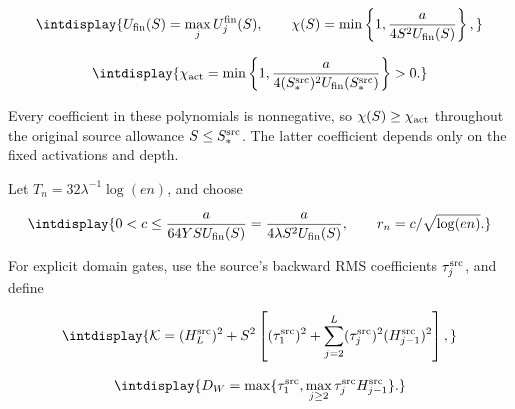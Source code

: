 \begingroup\renewcommand{\theHequation}{intdisplay.86}
\begin{equation*}
\intdisplay{
U_{\rm fin}(S)=\max_jU_j^{\rm fin}(S),\qquad
\chi(S)=\min\left\{1,\frac{a}{4S^2U_{\rm fin}(S)}\right\},
}
\end{equation*}
\endgroup

\begingroup\renewcommand{\theHequation}{intdisplay.87}
\begin{equation*}
\intdisplay{
\chi_{\rm act}=\min\left\{1,
\frac{a}{4(S_*^{\rm src})^2U_{\rm fin}(S_*^{\rm src})}\right\}>0.
}
\end{equation*}
\endgroup


Every coefficient in these polynomials is nonnegative, so \(\chi(S)\ge\chi_{\rm act}\) throughout the original source allowance \(S\le S_*^{\rm src}\). The latter coefficient depends only on the fixed activations and depth.



Let \(T_n=32\lambda^{-1}\log(en)\), and choose


\begingroup\renewcommand{\theHequation}{intdisplay.88}
\begin{equation*}
\intdisplay{
0<c\le\frac{a}{64YSU_{\rm fin}(S)}
=\frac{a}{4\lambda S^2U_{\rm fin}(S)},\qquad r_n=c/\sqrt{\log(en)}.
}
\end{equation*}
\endgroup


For explicit domain gates, use the source's backward RMS coefficients \(\tau_j^{\rm src}\), and define


\begingroup\renewcommand{\theHequation}{intdisplay.89}
\begin{equation*}
\intdisplay{
\mathcal K=(H_L^{\rm src})^2+
S^2\left[(\tau_1^{\rm src})^2+
\sum_{j=2}^L(\tau_j^{\rm src})^2(H_{j-1}^{\rm src})^2\right],
}
\end{equation*}
\endgroup

\begingroup\renewcommand{\theHequation}{intdisplay.90}
\begin{equation*}
\intdisplay{
D_W=\max\{\tau_1^{\rm src},
\max_{j\ge2}\tau_j^{\rm src}H_{j-1}^{\rm src}\}.
}
\end{equation*}
\endgroup


